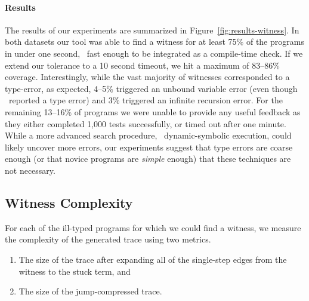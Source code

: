 \paragraph{Results}
\label{sec:results-witness}
The results of our experiments are summarized in
Figure~\ref{fig:results-witness}.
%
In both datasets our tool was able to find a witness for at least 75\% of the
programs in under one second, \ie\ fast enough to be integrated as a
compile-time check. If we extend our tolerance to a 10 second timeout,
we hit a maximum of 83--86\% coverage.
%
Interestingly, while the vast majority of witnesses corresponded to a
type-error, as expected, 4--5\% triggered an unbound variable error (even
though \ocaml\ reported a type error) and 3\% triggered an infinite
recursion error.
%
For the remaining 13--16\% of programs we were unable to provide any useful
feedback as they either completed 1,000 tests successfully, or timed out
after one minute.
%
%
While a more advanced search procedure, \eg\ dynamic-symbolic execution,
could likely uncover more errors, our experiments suggest that
type errors are coarse enough (or that novice programs are \emph{simple}
enough) that these techniques are not necessary.




\subsection{Witness Complexity}
\label{sec:trace-complexity}

For each of the ill-typed programs for which we could
find a witness, we measure the complexity of the generated
trace using two metrics.

%
\begin{enumerate}
\item {} The size of the trace after expanding
  all of the single-step edges from the witness to the stuck term, and
\item {} The size of the jump-compressed trace.
\end{enumerate}


